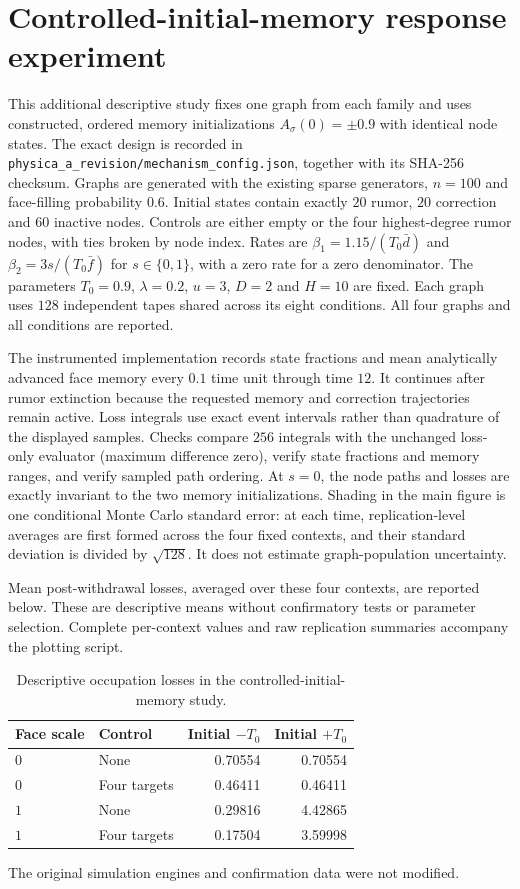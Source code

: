 \documentclass[preprint,11pt,sort&compress]{elsarticle}
\begin{document}
\FloatBarrier\section{Controlled-initial-memory response experiment}\label{sec:memory_response_details}
This additional descriptive study fixes one graph from each family and uses constructed, ordered memory initializations $A_\sigma(0)=\pm0.9$ with identical node states. The exact design is recorded in \texttt{physica\_a\_revision/mechanism\_config.json}, together with its SHA-256 checksum. Graphs are generated with the existing sparse generators, $n=100$ and face-filling probability $0.6$. Initial states contain exactly $20$ rumor, $20$ correction and $60$ inactive nodes. Controls are either empty or the four highest-degree rumor nodes, with ties broken by node index. Rates are $\beta_1=1.15/(T_0\bar d)$ and $\beta_2=3s/(T_0\bar f)$ for $s\in\{0,1\}$, with a zero rate for a zero denominator. The parameters $T_0=0.9$, $\lambda=0.2$, $u=3$, $D=2$ and $H=10$ are fixed. Each graph uses $128$ independent tapes shared across its eight conditions. All four graphs and all conditions are reported.

The instrumented implementation records state fractions and mean analytically advanced face memory every $0.1$ time unit through time $12$. It continues after rumor extinction because the requested memory and correction trajectories remain active. Loss integrals use exact event intervals rather than quadrature of the displayed samples. Checks compare $256$ integrals with the unchanged loss-only evaluator (maximum difference zero), verify state fractions and memory ranges, and verify sampled path ordering. At $s=0$, the node paths and losses are exactly invariant to the two memory initializations. Shading in the main figure is one conditional Monte Carlo standard error: at each time, replication-level averages are first formed across the four fixed contexts, and their standard deviation is divided by $\sqrt{128}$. It does not estimate graph-population uncertainty.

Mean post-withdrawal losses, averaged over these four contexts, are reported below. These are descriptive means without confirmatory tests or parameter selection. Complete per-context values and raw replication summaries accompany the plotting script.
\begin{table}[ht]\centering
\caption{Descriptive occupation losses in the controlled-initial-memory study.}
\begin{tabular}{llrr}\toprule
Face scale & Control & Initial $-T_0$ & Initial $+T_0$\\\midrule
$0$ & None & 0.70554 & 0.70554\\
$0$ & Four targets & 0.46411 & 0.46411\\
$1$ & None & 0.29816 & 4.42865\\
$1$ & Four targets & 0.17504 & 3.59998\\\bottomrule
\end{tabular}\end{table}
The original simulation engines and confirmation data were not modified.
\end{document}
